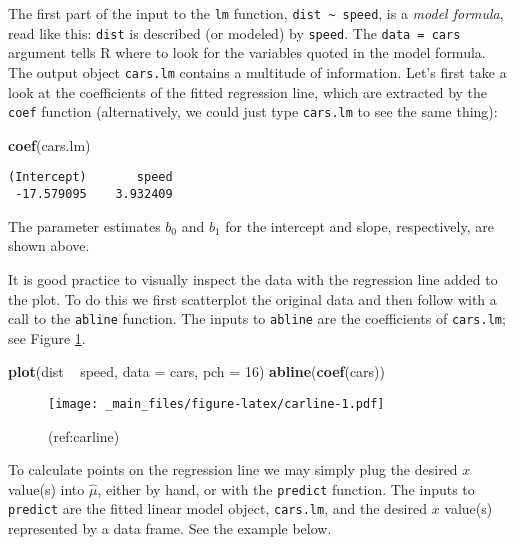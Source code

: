 \documentclass[]{book}
\newenvironment{Shaded}{\begin{snugshade}}{\end{snugshade}}
\newcommand{\KeywordTok}[1]{\textcolor[rgb]{0.13,0.29,0.53}{\textbf{{#1}}}}
\newcommand{\DataTypeTok}[1]{\textcolor[rgb]{0.13,0.29,0.53}{{#1}}}
\newcommand{\DecValTok}[1]{\textcolor[rgb]{0.00,0.00,0.81}{{#1}}}
\newcommand{\StringTok}[1]{\textcolor[rgb]{0.31,0.60,0.02}{{#1}}}
\newcommand{\NormalTok}[1]{{#1}}
\numberwithin{equation}{chapter}
\numberwithin{figure}{chapter}
\theoremstyle{plain}
\theoremstyle{definition}
\theoremstyle{remark}
\theoremstyle{definition}
\theoremstyle{definition}
\theoremstyle{remark}
\begin{document}
The first part of the input to the \texttt{lm} function,
\texttt{dist\ \textasciitilde{}\ speed}, is a \emph{model formula}, read
like this: \texttt{dist} is described (or modeled) by \texttt{speed}.
The \texttt{data\ =\ cars} argument tells R where to look for the
variables quoted in the model formula. The output object
\texttt{cars.lm} contains a multitude of information. Let's first take a
look at the coefficients of the fitted regression line, which are
extracted by the \texttt{coef} function (alternatively, we could just
type \texttt{cars.lm} to see the same thing):

\begin{Shaded}
\begin{Highlighting}[]
\KeywordTok{coef}\NormalTok{(cars.lm)}
\end{Highlighting}
\end{Shaded}

\begin{verbatim}
(Intercept)       speed 
 -17.579095    3.932409 
\end{verbatim}

The parameter estimates \(b_{0}\) and \(b_{1}\) for the intercept and
slope, respectively, are shown above.

It is good practice to visually inspect the data with the regression
line added to the plot. To do this we first scatterplot the original
data and then follow with a call to the \texttt{abline} function. The
inputs to \texttt{abline} are the coefficients of \texttt{cars.lm}; see
Figure \ref{fig:carline}.

\begin{Shaded}
\begin{Highlighting}[]
\KeywordTok{plot}\NormalTok{(dist ~}\StringTok{ }\NormalTok{speed, }\DataTypeTok{data =} \NormalTok{cars, }\DataTypeTok{pch =} \DecValTok{16}\NormalTok{)}
\KeywordTok{abline}\NormalTok{(}\KeywordTok{coef}\NormalTok{(cars))}
\end{Highlighting}
\end{Shaded}

\begin{figure}[htbp]
\centering
\texttt{[image: \_main\_files/figure-latex/carline-1.pdf]}
\caption{\label{fig:carline}(ref:carline)}
\end{figure}




To calculate points on the regression line we may simply plug the
desired \(x\) value(s) into \(\hat{\mu}\), either by hand, or with the
\texttt{predict} function. The inputs to \texttt{predict} are the fitted
linear model object, \texttt{cars.lm}, and the desired \(x\) value(s)
represented by a data frame. See the example below.
\end{document}
